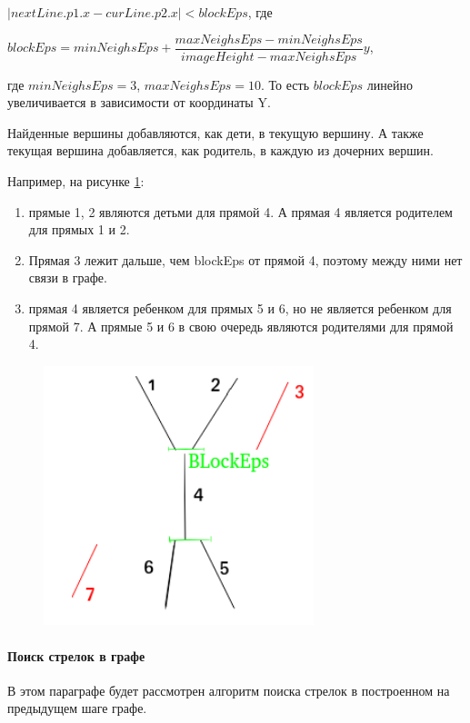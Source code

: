 $|nextLine.p1.x - curLine.p2.x| < blockEps$, где  

$blockEps = minNeighsEps + \dfrac{maxNeighsEps - minNeighsEps}{imageHeight - maxNeighsEps}y$, 

где  $minNeighsEps = 3$, $maxNeighsEps = 10$. То есть $blockEps$ линейно увеличивается в зависимости от координаты Y.

Найденные вершины добавляются, как дети, в текущую вершину. А также текущая вершина добавляется, как родитель, в каждую из дочерних вершин.

Например, на рисунке \ref{fig:neighscheck}:
\begin{enumerate}
	\item прямые 1, 2 являются детьми для прямой 4. А прямая 4 является родителем для прямых 1 и 2.
	\item Прямая 3 лежит дальше, чем blockEps от прямой 4, поэтому между ними нет связи в графе.
	\item прямая 4 является ребенком для прямых 5 и 6, но не является ребенком для прямой 7. А прямые 5 и 6 в свою очередь являются родителями для прямой 4.
\end{enumerate}
\begin{figure}[!h]
	\centering
	\includegraphics[width=0.7\textwidth]{pictures/neighs_check}
	\caption[Создание ребер]{}
	\label{fig:neighscheck}
\end{figure}

\paragraph{Поиск стрелок в графе}

В этом параграфе будет рассмотрен алгоритм поиска стрелок в построенном на предыдущем шаге графе. 

